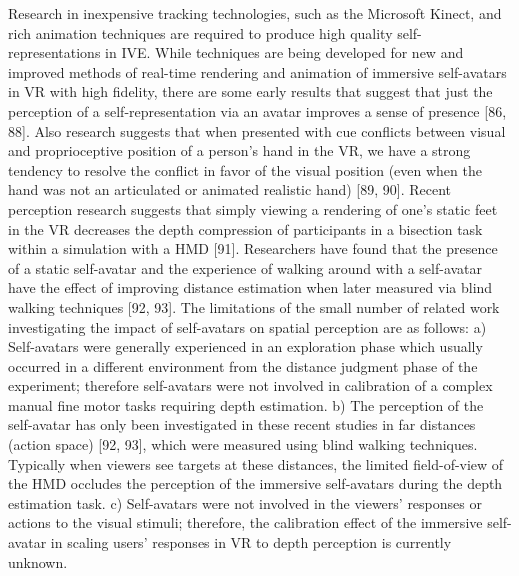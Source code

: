 Research in inexpensive tracking technologies, such as the Microsoft Kinect, and rich animation techniques are required to produce high quality self-representations in IVE. While techniques are being developed for new and improved methods of real-time rendering and animation of immersive self-avatars in VR with high fidelity, there are some early results that suggest that just the perception of a self-representation via an avatar improves a sense of presence [86, 88]. Also research suggests that when presented with cue conflicts between visual and proprioceptive position of a person’s hand in the VR, we have a strong tendency to resolve the conflict in favor of the visual position (even when the hand was not an articulated or animated realistic hand) [89, 90]. Recent perception research suggests that simply viewing a rendering of one’s static feet in the VR decreases the depth compression of participants in a bisection task within a simulation with a HMD [91]. Researchers have found that the presence of a static self-avatar and the experience of walking around with a self-avatar have the effect of improving distance estimation when later measured via blind walking techniques [92, 93]. The limitations of the small number of related work investigating the impact of self-avatars on spatial perception are as follows: a) Self-avatars were generally experienced in an exploration phase which usually occurred in a different environment from the distance judgment phase of the experiment; therefore self-avatars were not involved in calibration of a complex manual fine motor tasks requiring depth estimation. b) The perception of the self-avatar has only been investigated in these recent studies in far distances (action space) [92, 93], which were measured using blind walking techniques. Typically when viewers see targets at these distances, the limited field-of-view of the HMD occludes the perception of the immersive self-avatars during the depth estimation task. c) Self-avatars were not involved in the viewers’ responses or actions to the visual stimuli; therefore, the calibration effect of the immersive self-avatar in scaling users’ responses in VR to depth perception is currently unknown.

